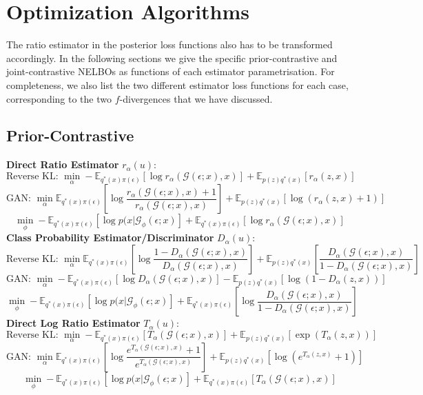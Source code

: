 \documentclass[honours,12pt]{unswthesis}
\newcommand{\E}{\mathbb{E}}
\numberwithin{equation}{section}
\theoremstyle{definition}
\begin{document}
\section{Optimization Algorithms}
The ratio estimator in the posterior loss functions also has to be transformed accordingly. In the following sections we give the specific prior-contrastive and joint-contrastive NELBOs as functions of each estimator parametrisation. For completeness, we also list the two different estimator loss functions for each case, corresponding to the two $f$-divergences that we have discussed.
\subsection{Prior-Contrastive}
\textbf{Direct Ratio Estimator} $r_\alpha(u)$:
\[\text{Reverse KL: }\min_\alpha -\E_{q^*(x)\pi(\epsilon)}[\log r_\alpha(\mathcal{G}(\epsilon;x),x)]+\E_{p(z)q^*(x)}[r_\alpha(z,x)]\]
\[\text{GAN: }\min_\alpha \E_{q^*(x)\pi(\epsilon)}\left[\log \frac{r_\alpha(\mathcal{G}(\epsilon;x),x)+1}{r_\alpha(\mathcal{G}(\epsilon;x),x)}\right]+\E_{p(z)q^*(x)}[\log(r_\alpha(z,x)+1)]\]
\[\min_\phi-\E_{q^*(x)\pi(\epsilon)}[\log p(x|\mathcal{G}_\phi(\epsilon;x)]+\E_{q^*(x)\pi(\epsilon)}[\log r_\alpha(\mathcal{G}(\epsilon;x),x)]\]
\textbf{Class Probability Estimator/Discriminator} $D_\alpha(u)$:
\[\text{Reverse KL: }\min_\alpha \E_{q^*(x)\pi(\epsilon)}\left[\log \frac{1-D_\alpha(\mathcal{G}(\epsilon;x),x)}{D_\alpha(\mathcal{G}(\epsilon;x),x)}\right]+\E_{p(z)q^*(x)}\left[\frac{D_\alpha(\mathcal{G}(\epsilon;x),x)}{1-D_\alpha(\mathcal{G}(\epsilon;x),x)}\right]\]
\[\text{GAN: }\min_\alpha -\E_{q^*(x)\pi(\epsilon)}[\log D_\alpha(\mathcal{G}(\epsilon;x),x)]-\E_{p(z)q^*(x)}[\log(1-D_\alpha(z,x))]\]
\[\min_\phi-\E_{q^*(x)\pi(\epsilon)}[\log p(x|\mathcal{G}_\phi(\epsilon;x)]+\E_{q^*(x)\pi(\epsilon)}\left[\log \frac{D_\alpha(\mathcal{G}(\epsilon;x),x)}{1-D_\alpha(\mathcal{G}(\epsilon;x),x)}\right]\]
\textbf{Direct Log Ratio Estimator} $T_\alpha(u)$:
\[\text{Reverse KL: }\min_\alpha -\E_{q^*(x)\pi(\epsilon)}[T_\alpha(\mathcal{G}(\epsilon;x),x)]+\E_{p(z)q^*(x)}[\exp(T_\alpha(z,x))]\]
\[\text{GAN: }\min_\alpha \E_{q^*(x)\pi(\epsilon)}\left[\log \frac{e^{T_\alpha(\mathcal{G}(\epsilon;x),x)}+1}{e^{T_\alpha(\mathcal{G}(\epsilon;x),x)}}\right]+\E_{p(z)q^*(x)}[\log(e^{T_\alpha(z,x)}+1)]\]
\[\min_\phi-\E_{q^*(x)\pi(\epsilon)}[\log p(x|\mathcal{G}_\phi(\epsilon;x)]+\E_{q^*(x)\pi(\epsilon)}[T_\alpha(\mathcal{G}(\epsilon;x),x)]\]
\end{document}
